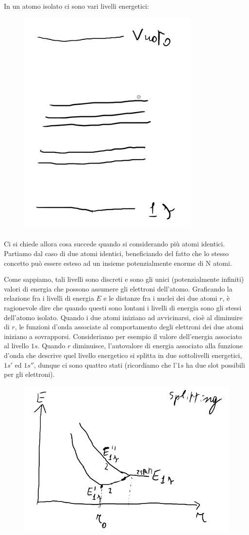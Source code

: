 \documentclass{book}
\begin{document}
        \paragraph{} In un atomo isolato ci sono vari livelli energetici:
            \begin{figure}[h!]
                \centering
                \includegraphics[width=0.35\linewidth]{img/chapSeiLivelliElettrone.png}
                \label{livelliEnergiaAtomoSingolo}
            \end{figure}
        \newpage
        \paragraph{} Ci si chiede allora cosa succede quando si considerando più atomi identici. Partiamo dal caso di due atomi identici, beneficiando del fatto che lo stesso concetto può essere esteso ad un insieme potenzialmente enorme di N atomi.

        Come sappiamo, tali livelli sono discreti e sono gli unici (potenzialmente infiniti) valori di energia che possono assumere gli elettroni dell'atomo. Graficando la relazione fra i livelli di energia $E$ e le distanze fra i nuclei dei due atomi $r$, è ragionevole dire che quando questi sono lontani i livelli di energia sono gli stessi dell'atomo isolato. Quando i due atomi iniziano ad avvicinarsi, cioè al diminuire di $r$, le funzioni d'onda associate al comportamento degli elettroni dei due atomi iniziano a sovrapporsi.
        \newline
        Consideriamo per esempio il valore dell'energia associato al livello $1s$. Quando $r$ diminuisce, l'autovalore di energia associato alla funzione d'onda che descrive quel livello energetico si splitta in due sottolivelli energetici, $1s'$ ed $1s''$, dunque ci sono quattro stati (ricordiamo che l'$1s$ ha due slot possibili per gli elettroni).\\
        \begin{figure}[h!]
            \centering
            \includegraphics[width=0.5\linewidth]{img/Splitting2.png}
            \label{fig:splitting}
        \end{figure}
\end{document}
